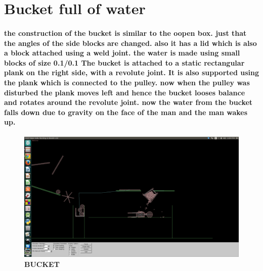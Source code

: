 \section{Bucket full of water}
\paragraph{
the construction of the bucket is similar to the oopen box.
just that the angles of the side blocks are changed.
also it has a lid which is also a block attached using a weld joint.
the water is made using small blocks of size 0.1/0.1
The bucket is attached to a static rectangular plank on the right side, with a revolute joint.
It is also supported using the plank which is connected to the pulley.
now when the pulley was disturbed the plank moves left and hence the bucket looses balance and rotates around the revolute joint.
now the water from the bucket falls down due to gravity on the face of the man and the man wakes up.
}
\begin{figure}[H]
  \centering
    \includegraphics[scale=0.2]{project/images/bucket.png}
  \caption{\textbf{BUCKET}}
\end{figure}


